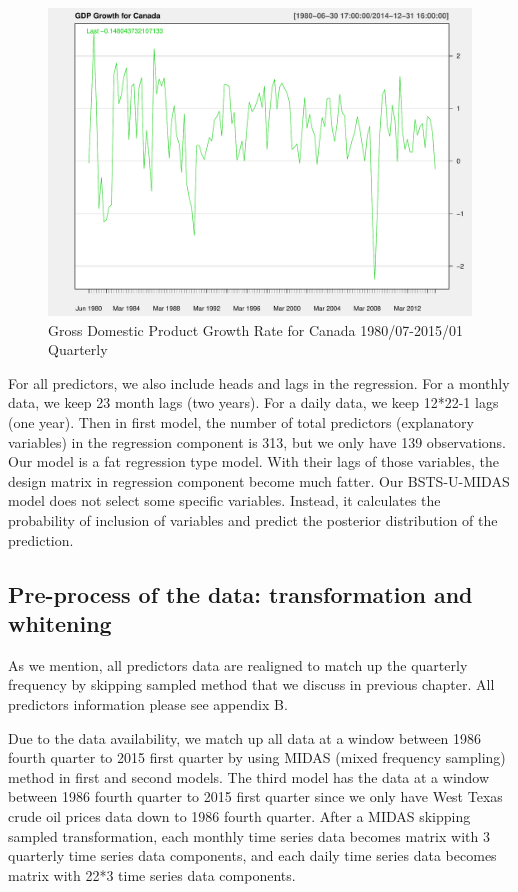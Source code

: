 \begin{figure}[h]
	\centering
	\includegraphics[width=0.6\linewidth]{Figures/gdp-growth-report}
	\caption{Gross Domestic Product Growth Rate for Canada 1980/07-2015/01 Quarterly}
	\label{fig:gdp-growth}
\end{figure}


For all predictors, we also include heads and lags in the regression. For a monthly data, we keep 23 month lags (two years). For a daily data, we keep 12*22-1 lags (one year). Then in first model, the number of total predictors (explanatory variables) in the regression component is 313, but we only have 139 observations. Our model is a fat regression type model.  With their lags of those variables, the design matrix in regression component become much fatter. Our BSTS-U-MIDAS model does not select some specific variables. Instead, 
it calculates the probability of inclusion of variables and predict the posterior distribution of the prediction. 



\subsection{Pre-process of the data: transformation and whitening}


As we mention, all predictors data are realigned to match up the quarterly frequency by skipping sampled method that we discuss in previous chapter. All predictors information please see appendix B. 

Due to the data availability, we match up all data at a window between 1986 fourth quarter to 2015 first quarter by using MIDAS (mixed frequency sampling) method in first and second models. The third model has the data at a window between 1986 fourth quarter to 2015 first quarter since we only have West Texas crude oil prices data down to 1986 fourth quarter. After a MIDAS skipping sampled transformation, each monthly time series data becomes matrix with 3 quarterly time series data components, and each daily time series data becomes matrix with 22*3 time series data components.

